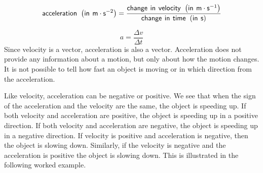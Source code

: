     \begin{equation}
    \mathsf{acceleration}\phantom{\rule{4pt}{0ex}}\left(\mathsf{in}\phantom{\rule{4pt}{0ex}}\mathsf{m}\ensuremath{\cdot}{\mathsf{s}}^{-2}\right)=\frac{\mathsf{change}\phantom{\rule{4pt}{0ex}}\mathsf{in}\phantom{\rule{4pt}{0ex}}\mathsf{velocity}\phantom{\rule{4pt}{0ex}}\left(\mathsf{in}\phantom{\rule{4pt}{0ex}}\mathsf{m}\ensuremath{\cdot}{\mathsf{s}}^{-1}\right)}{\mathsf{change}\phantom{\rule{4pt}{0ex}}\mathsf{in}\phantom{\rule{4pt}{0ex}}\mathsf{time}\phantom{\rule{4pt}{0ex}}\left(\mathsf{in}\phantom{\rule{4pt}{0ex}}\mathsf{s}\right)}
      \end{equation}
      \label{m38794*id67742}\nopagebreak\noindent{}
        
    \begin{equation}
    a=\frac{\Delta v}{\Delta t}
      \end{equation}
      \label{m38794*id67769}Since velocity is a vector, acceleration is also a vector. Acceleration does not provide any information about a motion, but only about how the motion changes. It is not possible to tell how fast an object is moving or in which direction from the acceleration.\par 
      \label{m38794*id67775}Like velocity, acceleration can be negative or positive. We see that when the sign of the acceleration and the velocity are the same, the object is speeding up. If both velocity and acceleration are positive, the object is speeding up in a positive direction. If both velocity and acceleration are negative, the object is speeding up in a negative direction.
If velocity is positive and acceleration is negative, then the object is slowing down. Similarly, if the velocity is negative and the acceleration is positive the object is slowing down. This is illustrated in the following worked example.\par 
